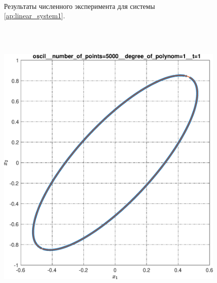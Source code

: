 \documentclass[../main.tex]{subfiles}
\begin{document}
\begin{figure}[ht!]
\begin{minipage}[b]{.3\linewidth}
 	\end{minipage} 
 	\caption{Результаты численного эксперимента для системы \eqref{ap:linear_system1}.}\label{fig:ap:rs_linear1}
 \end{figure}
 
 \begin{figure}[ht!] 
 	 \hspace{-2.5ex}
 	\begin{minipage}[b]{.3\linewidth} 
 		\small
 		\centering 
 		\includegraphics[width=\linewidth]{images/oscil__number_of_points=5000__degree_of_polynom=1__t=1.eps}
 		\label{fig:ap:oscilN5103k1T1} 
 	\end{minipage}
 	\hfill
 	\begin{minipage}[b]{.3\linewidth} 
 		\small
 		\centering

\end{minipage}
\end{figure}
\end{document}
